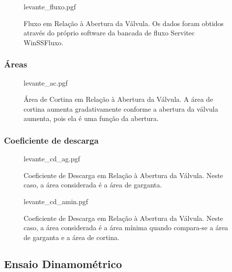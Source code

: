 \begin{figure}[!htb]
    \centering
    \caption[Fluxo em Relação à Abertura da Válvula]{Fluxo em Relação à Abertura da Válvula. Os dados foram obtidos através do próprio software da bancada de fluxo Servitec WinSSFluxo.}
    {levante_fluxo.pgf}
    \label{fig:fluxo_levante}
\end{figure}

\subsubsection*{Áreas}

\begin{figure}[!htb]
    \centering
    \caption[Área de Cortina em Relação à Abertura da Válvula]{Área de Cortina em Relação à Abertura da Válvula. A área de cortina aumenta gradativamente conforme a abertura da válvula aumenta, pois ela é uma função da abertura.}
    {levante_ac.pgf}
    \label{fig:fluxo_ac}
\end{figure}

\subsubsection*{Coeficiente de descarga}

\begin{figure}[!htb]
    \centering
    \caption[Coeficiente de Descarga em Relação à Abertura da Válvula (Área de Garganta)]{Coeficiente de Descarga em Relação à Abertura da Válvula. Neste caso, a área considerada é a área de garganta.}
    {levante_cd_ag.pgf}
    \label{fig:fluxo_cd_ag}
\end{figure}

\begin{figure}[!htb]
    \centering
    \caption[Coeficiente de Descarga em Relação à Abertura da Válvula (Área Mínima)]{Coeficiente de Descarga em Relação à Abertura da Válvula. Neste caso, a área considerada é a área mínima quando compara-se a área de garganta e a área de cortina.}
    {levante_cd_amin.pgf}
    \label{fig:fluxo_cd_amin}
\end{figure}


\subsection{Ensaio Dinamométrico}

